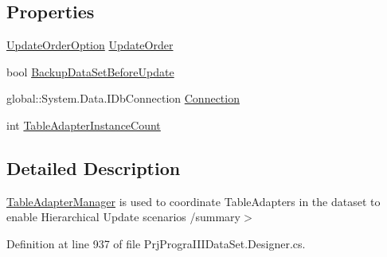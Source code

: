 \subsection*{Properties}
\begin{DoxyCompactItemize}
\item 
\hyperlink{classprj_progra_i_i_i_1_1_prj_progra_i_i_i_data_set_table_adapters_1_1_table_adapter_manager_ada8b937dd32f0e82f86deb1a45b384a6}{Update\+Order\+Option} \hyperlink{classprj_progra_i_i_i_1_1_prj_progra_i_i_i_data_set_table_adapters_1_1_table_adapter_manager_a8e1c2276fcfafd8bb10f7ebfd26710a3}{Update\+Order}
\item 
bool \hyperlink{classprj_progra_i_i_i_1_1_prj_progra_i_i_i_data_set_table_adapters_1_1_table_adapter_manager_aef3198709057aac0bb3786f3f6450d50}{Backup\+Data\+Set\+Before\+Update}
\item 
global\+::\+System.\+Data.\+I\+Db\+Connection \hyperlink{classprj_progra_i_i_i_1_1_prj_progra_i_i_i_data_set_table_adapters_1_1_table_adapter_manager_a9d6da15969a038b43f7c48db53c03ea5}{Connection}
\item 
int \hyperlink{classprj_progra_i_i_i_1_1_prj_progra_i_i_i_data_set_table_adapters_1_1_table_adapter_manager_a7cbe32dfd6a78698458c3c2b99746333}{Table\+Adapter\+Instance\+Count}
\end{DoxyCompactItemize}


\subsection{Detailed Description}
\hyperlink{classprj_progra_i_i_i_1_1_prj_progra_i_i_i_data_set_table_adapters_1_1_table_adapter_manager}{Table\+Adapter\+Manager} is used to coordinate Table\+Adapters in the dataset to enable Hierarchical Update scenarios /summary$>$ 

Definition at line 937 of file Prj\+Progra\+I\+I\+I\+Data\+Set.\+Designer.\+cs.



